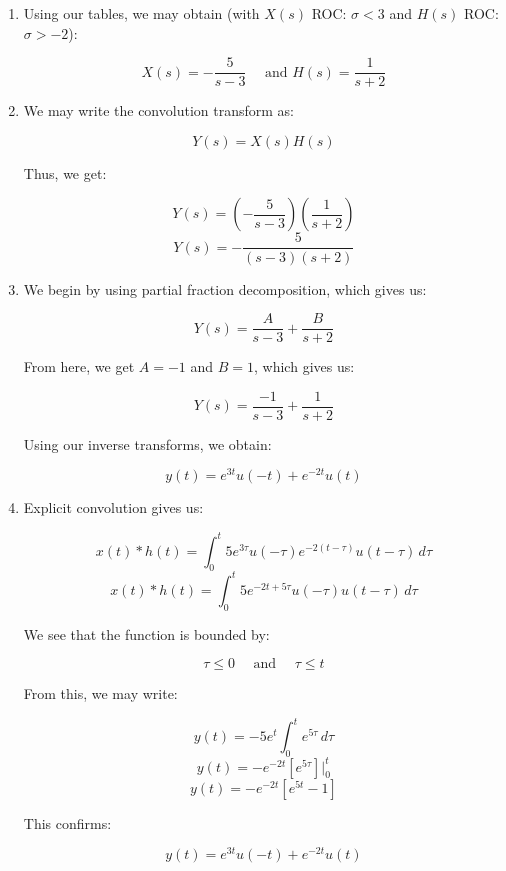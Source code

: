 \begin{enumerate}
    \begin{enumerate}

      \item 

        Using our tables, we may obtain (with $X(s)$ ROC: $\sigma <3$ and $H(s)$ ROC: $\sigma>-2$):

        $$\boxed{X(s)=-\frac{5}{s-3}\quad\text{ and }H(s)=\frac{1}{s+2}}$$

      \item 

        We may write the convolution transform as:

        $$Y(s)=X(s)H(s)$$

        Thus, we get:

        $$Y(s)=\left( -\frac{5}{s-3} \right)\left( \frac{1}{s+2} \right)$$
        $$\boxed{Y(s)=-\frac{5}{(s-3)(s+2)}}$$

      \item 

        We begin by using partial fraction decomposition, which gives us:

        $$Y(s)=\frac{A}{s-3}+\frac{B}{s+2}$$

        From here, we get $A=-1$ and $B=1$, which gives us:

        $$Y(s)=\frac{-1}{s-3}+\frac{1}{s+2}$$

        Using our inverse transforms, we obtain:

        $$\boxed{y(t)=e^{3t}u(-t)+e^{-2t}u(t)}$$

      \item 

        Explicit convolution gives us:

        $$x(t)*h(t)=\int_0^t 5e^{3\tau}u(-\tau)e^{-2(t-\tau)}u(t-\tau)\,d\tau$$
        $$x(t)*h(t)=\int_0^t 5e^{-2t+5\tau}u(-\tau)u(t-\tau)\,d\tau$$

        We see that the function is bounded by:

        $$\tau \leq 0\quad\text{ and }\quad \tau\leq t$$

        From this, we may write:

        $$y(t)=-5e^t\int_0^t e^{5\tau}\,d\tau$$
        $$y(t)=-e^{-2t}\left[ e^{5\tau} \right]\Big|_0^t$$
        $$y(t)=-e^{-2t}\left[ e^{5t}-1 \right]$$

        This confirms:

        $$\boxed{y(t)=e^{3t}u(-t)+e^{-2t}u(t)}$$

    \end{enumerate}


\end{enumerate}
